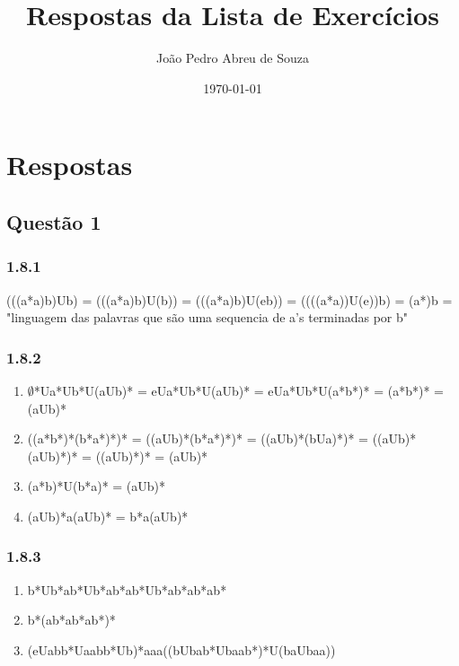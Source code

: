 \documentclass{article}
\begin{document}
	
	\title{Respostas da Lista de Exercícios}
	\author{João Pedro Abreu de Souza}
	\date{\today}
	\maketitle
	
	\section{Respostas}
	
	\subsection{Questão 1}
	
	\subsubsection{1.8.1}
	(((a*a)b)Ub) = (((a*a)b)U(b)) = (((a*a)b)U(eb)) = ((((a*a))U(e))b) = (a*)b = "linguagem das palavras que são uma sequencia de a's terminadas por b"
	\subsubsection{1.8.2}
	\begin{enumerate}[label=(\alph*)]
		\item $\emptyset$*Ua*Ub*U(aUb)* = eUa*Ub*U(aUb)* = eUa*Ub*U(a*b*)* = (a*b*)* = (aUb)*
		\item ((a*b*)*(b*a*)*)* = ((aUb)*(b*a*)*)* = ((aUb)*(bUa)*)* = ((aUb)*(aUb)*)* = ((aUb)*)* = (aUb)*
		\item (a*b)*U(b*a)* = (aUb)*
		\item (aUb)*a(aUb)* = b*a(aUb)*
	\end{enumerate}
	\subsubsection{1.8.3}
	\begin{enumerate}[label=(\alph*)]
		\item b*Ub*ab*Ub*ab*ab*Ub*ab*ab*ab*
		\item b*(ab*ab*ab*)*
		\item (eUabb*Uaabb*Ub)*aaa((bUbab*Ubaab*)*U(baUbaa))
	\end{enumerate}
\end{document}
